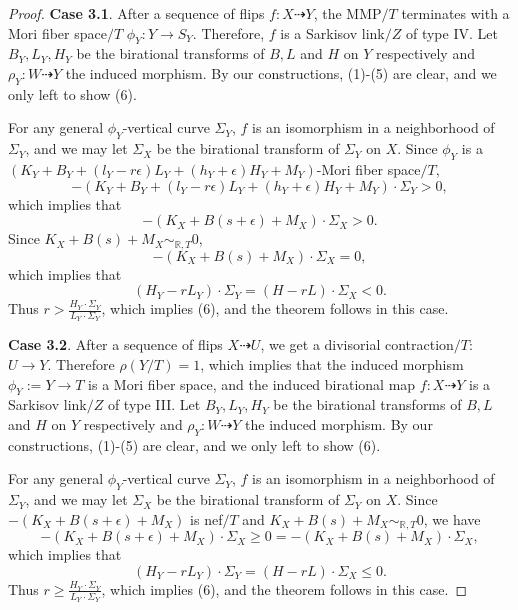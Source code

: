 \documentclass[11pt]{amsart}
\numberwithin{equation}{section}
\newcommand{\Rr}{\mathbb{R}}
\theoremstyle{definition}
\theoremstyle{remark}
\theoremstyle{definition}
\begin{document}
\begin{proof}
\medskip


\noindent\textbf{Case 3.1}. After a sequence of flips $f: X\dashrightarrow Y$, the MMP$/T$ terminates with a Mori fiber space$/T$ $\phi_Y: Y\rightarrow S_Y$. Therefore, $f$ is a Sarkisov link$/Z$ of type IV.  Let $B_Y,L_Y,H_Y$ be the birational transforms of $B,L$ and $H$ on $Y$ respectively and $\rho_Y: W\dashrightarrow Y$ the induced morphism. By our constructions, (1)-(5) are clear, and we only left to show (6).

For any general $\phi_Y$-vertical curve $\Sigma_Y$, $f$ is an isomorphism in a neighborhood of $\Sigma_Y$, and we may let $\Sigma_X$ be the birational transform of $\Sigma_Y$ on $X$. Since $\phi_Y$ is a $(K_Y+B_Y+(l_Y-r\epsilon)L_Y+(h_Y+\epsilon)H_Y+M_Y)$-Mori fiber space$/T$, 
$$-(K_Y+B_Y+(l_Y-r\epsilon)L_Y+(h_Y+\epsilon)H_Y+M_Y)\cdot\Sigma_Y>0,$$
which implies that
$$-(K_X+B(s+\epsilon)+M_X)\cdot\Sigma_X>0.$$
Since $K_X+B(s)+M_X\sim_{\Rr,T}0$, 
$$-(K_X+B(s)+M_X)\cdot\Sigma_X=0,$$
which implies that 
$$(H_Y-rL_Y)\cdot\Sigma_Y=(H-rL)\cdot\Sigma_X<0.$$ 
Thus $r>\frac{H_Y\cdot\Sigma_Y}{L_Y\cdot\Sigma_Y}$, which implies (6), and the theorem follows in this case.

\medskip

\noindent\textbf{Case 3.2}. After a sequence of flips $X\dashrightarrow U$, we get a divisorial contraction$/T$: $U\rightarrow Y$. Therefore $\rho(Y/T)=1$, which implies that the induced morphism $\phi_Y:=Y\rightarrow T$ is a Mori fiber space, and the induced birational map $f: X\dashrightarrow Y$ is a Sarkisov link$/Z$ of type III. Let $B_Y,L_Y,H_Y$ be the birational transforms of $B,L$ and $H$ on $Y$ respectively and $\rho_Y: W\dashrightarrow Y$ the induced morphism. By our constructions, (1)-(5) are clear, and we only left to show (6).

For any general $\phi_Y$-vertical curve $\Sigma_Y$, $f$ is an isomorphism in a neighborhood of $\Sigma_Y$, and we may let $\Sigma_X$ be the birational transform of $\Sigma_Y$ on $X$. Since $-(K_X+B(s+\epsilon)+M_X)$ is nef$/T$ and $K_X+B(s)+M_X\sim_{\Rr,T}0$, we have
$$-(K_X+B(s+\epsilon)+M_X)\cdot\Sigma_X\geq 0=-(K_X+B(s)+M_X)\cdot\Sigma_X,$$
which implies that 
$$(H_Y-rL_Y)\cdot\Sigma_Y=(H-rL)\cdot\Sigma_X\leq 0.$$ 
Thus $r\geq\frac{H_Y\cdot\Sigma_Y}{L_Y\cdot\Sigma_Y}$, which implies (6), and the theorem follows in this case.

\medskip


\end{proof}
\end{document}
